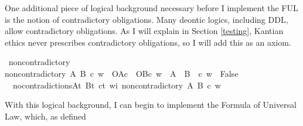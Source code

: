 \begin{isabellebody}
%
%
\begin{isamarkuptext}%
One additional piece of logical background necessary before I implement the FUL is the 
notion of contradictory obligations. Many deontic logics, including DDL, allow contradictory
obligations. As I will explain in Section \ref{testing}, Kantian ethics never prescribes contradictory
obligations, so I will add this as an axiom.%
\end{isamarkuptext}\isamarkuptrue%
\isamarkupfalse%
\ non{\isacharunderscore}contradictory\ \ \isanewline
{\isachardoublequoteopen}non{\isacharunderscore}contradictory\ A\ B\ c\ w\ {\isasymequiv}\ {\isacharparenleft}{\isacharparenleft}O{\isacharbraceleft}A{\isacharbar}c{\isacharbraceright}\ \isactrlbold {\isasymand}\ O{\isacharbraceleft}B{\isacharbar}c{\isacharbraceright}{\isacharparenright}\ w{\isacharparenright}\ {\isasymlongrightarrow}\ {\isasymnot}{\isacharparenleft}{\isacharparenleft}A\ \isactrlbold {\isasymand}\ {\isacharparenleft}B\ \isactrlbold {\isasymand}\ c{\isacharparenright}{\isacharparenright}\ w\ {\isasymlongrightarrow}\ False{\isacharparenright}{\isachardoublequoteclose}\isanewline
%
\isanewline
{}\isamarkupfalse%
\ \ no{\isacharunderscore}contradictions{\isacharcolon}{\isachardoublequoteopen}{\isasymforall}A{\isacharcolon}{\isacharcolon}t{\isachardot}\ {\isasymforall}B{\isacharcolon}{\isacharcolon}t{\isachardot}\ {\isasymforall}c{\isacharcolon}{\isacharcolon}t{\isachardot}\ {\isasymforall}w{\isacharcolon}{\isacharcolon}i{\isachardot}\ non{\isacharunderscore}contradictory\ A\ B\ c\ w{\isachardoublequoteclose}\isanewline
%
%
\isadelimdocument
%
\endisadelimdocument
%
\isatagdocument
%
\isamarkuptrue%
%
\endisatagdocument
{\isafolddocument}%
%
\isadelimdocument
%
\endisadelimdocument
%
\begin{isamarkuptext}%
With this logical background, I can begin to implement the Formula of Universal Law, which, as defined 

\end{isamarkuptext}
\end{isabellebody}
